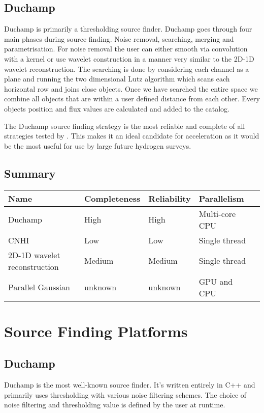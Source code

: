 \documentclass[prodmode,acmtecs]{acmsmall} \usepackage[ruled]{algorithm2e}
\begin{document}
     \subsection{Duchamp}
Duchamp is primarily a thresholding source finder. Duchamp goes through four main phases during source finding.
Noise removal, searching, merging and parametrisation. For noise removal the user can either smooth
via convolution with a kernel or use wavelet construction in a manner very similar to the 2D-1D wavelet
reconstruction. The searching is done by considering each channel as a plane and running the two dimensional
Lutz algorithm which scans each horizontal row and joins close objects. Once we have searched the entire
space we combine all objects that are within a user defined distance from each other. Every objects position
and flux values are calculated and added to the catalog.


The Duchamp source finding strategy  is the most reliable and complete of all strategies tested 
by \cite{popping2012comparison}. This makes it an ideal candidate for acceleration as it would
be the most useful for use by large future hydrogen surveys. 
     \cite{jurek2012characterised}

    \subsection{Summary}
\begin{tabular}{|l | l | l | l | l| }
  \hline
  Name  & Completeness & Reliability & Parallelism \\
  \hline
  \hline
  Duchamp  & High & High & Multi-core CPU \\
  \hline
  CNHI  & Low & Low & Single thread \\
  \hline
  2D-1D wavelet reconstruction & Medium & Medium & Single thread \\
  \hline
  Parallel Gaussian  & unknown & unknown & GPU and CPU \\
  \hline
\end{tabular}
\section{Source Finding Platforms}
    \subsection{Duchamp}
Duchamp is the most well-known source finder. It's written entirely in C++ and primarily uses
thresholding with various noise filtering schemes. The choice of noise filtering and thresholding
value is defined by the user at runtime.  
        \cite{whiting2012duchamp}
\end{document}
